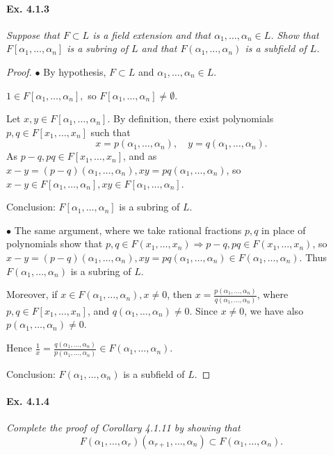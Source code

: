 \documentclass[11pt,a4paper]{article}
\begin{document}
\paragraph{Ex. 4.1.3}

{\it Suppose that $F\subset L$ is a field extension and that $\alpha_1,\ldots,\alpha_n \in L$. Show that $F[\alpha_1,\ldots,\alpha_n]$ is a subring of $L$ and that $F(\alpha_1,\ldots,\alpha_n)$ is a subfield of $L$.
}

\begin{proof}
$\bullet$ By hypothesis,  $F\subset L$ and $\alpha_1,\ldots,\alpha_n \in L$.

$1 \in F[\alpha_1,\ldots,\alpha_n],$ so $F[\alpha_1,\ldots,\alpha_n] \neq \emptyset$.

Let $x,y \in F[\alpha_1,\ldots,\alpha_n]$. By definition, there exist polynomials $p,q \in F[x_1,\ldots,x_n]$ such that
$$x = p(\alpha_1,\ldots,\alpha_n),\quad y = q(\alpha_1,\ldots,\alpha_n).$$
As $p-q,pq \in F[x_1,\ldots,x_n]$, and as $x-y = (p-q)(\alpha_1,\ldots,\alpha_n), xy = pq(\alpha_1,\ldots,\alpha_n)$, so $x-y \in F[\alpha_1,\ldots,\alpha_n], xy \in F[\alpha_1,\ldots,\alpha_n]$.

Conclusion: $F[\alpha_1,\ldots,\alpha_n]$ is a subring of $L$.

$\bullet$  The same argument, where we take rational fractions $p,q$ in place of polynomials show that $p,q \in F(x_1,\ldots,x_n) \Rightarrow p-q,pq \in F(x_1,\ldots,x_n)$, so $x-y = (p-q)(\alpha_1,\ldots,\alpha_n), xy = pq(\alpha_1,\ldots,\alpha_n) \in F(\alpha_1,\ldots,\alpha_n)$. Thus $F(\alpha_1,\ldots,\alpha_n)$ is a subring of $L$.

Moreover, if $x \in F(\alpha_1,\ldots,\alpha_n), x\neq 0$, then $x = \frac{p(\alpha_1,\ldots,\alpha_n)}{q(\alpha_1,\ldots,\alpha_n)}$, where $p,q \in F[x_1,\ldots,x_n]$, and $q(\alpha_1,\ldots,\alpha_n)\neq 0$. Since $x\neq 0$, we have also $p(\alpha_1,\ldots,\alpha_n) \neq 0$.

Hence $\frac{1}{x} = \frac{q(\alpha_1,\ldots,\alpha_n)}{p(\alpha_1,\ldots,\alpha_n)} \in F(\alpha_1,\ldots,\alpha_n)$.

Conclusion: $F(\alpha_1,\ldots,\alpha_n)$ is a subfield of $L$.
\end{proof}

\paragraph{Ex. 4.1.4}

{\it Complete the proof of Corollary 4.1.11 by showing that
$$F(\alpha_1,\ldots,\alpha_r)(\alpha_{r+1},\ldots,\alpha_n) \subset F(\alpha_1,\ldots,\alpha_n).$$
}
\end{document}
